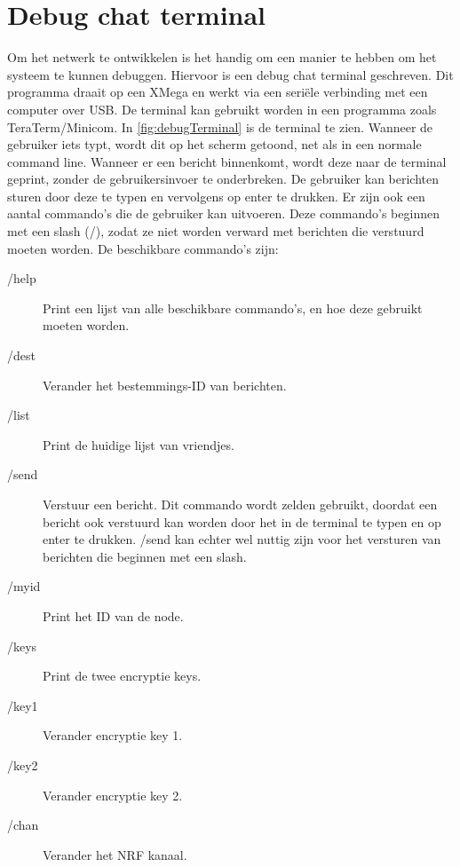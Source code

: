\section{Debug chat terminal} \label{sec:debugProgram}
Om het netwerk te ontwikkelen is het handig om een manier te hebben om het systeem te kunnen debuggen. Hiervoor is een debug chat terminal geschreven. Dit programma draait op een XMega en werkt via een seriële verbinding met een computer over USB. De terminal kan gebruikt worden in een programma zoals TeraTerm/Minicom. In \autoref{fig:debugTerminal} is de terminal te zien. Wanneer de gebruiker iets typt, wordt dit op het scherm getoond, net als in een normale command line. Wanneer er een bericht binnenkomt, wordt deze naar de terminal geprint, zonder de gebruikersinvoer te onderbreken. De gebruiker kan berichten sturen door deze te typen en vervolgens op enter te drukken. Er zijn ook een aantal commando's die de gebruiker kan uitvoeren. Deze commando's beginnen met een slash (/), zodat ze niet worden verward met berichten die verstuurd moeten worden.
De beschikbare commando's zijn:

\begin{description}
    \item[/help] Print een lijst van alle beschikbare commando's, en hoe deze gebruikt moeten worden.

    \item[/dest] Verander het bestemmings-ID van berichten.

    \item[/list] Print de huidige lijst van vriendjes. 

    \item[/send] Verstuur een bericht. Dit commando wordt zelden gebruikt, doordat een bericht ook verstuurd kan worden door het in de terminal te typen en op enter te drukken. /send kan echter wel nuttig zijn voor het versturen van berichten die beginnen met een slash.

    \item[/myid] Print het ID van de node.

    \item[/keys] Print de twee encryptie keys.

    \item[/key1] Verander encryptie key 1.
    \item[/key2] Verander encryptie key 2. 

    \item[/chan] Verander het NRF kanaal. 
\end{description}


